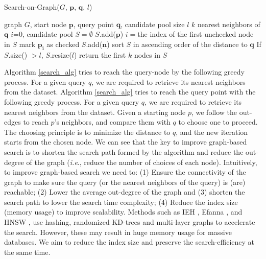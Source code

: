 \documentclass{vldb}
\def\ie {\emph{i.e}.} \def\Ie{\emph{I.e}.}
\begin{document}
\begin{algorithm}[t]\small
	\caption{Search-on-Graph($G$, $\textbf{p}$, $\textbf{q}$, $l$)}
	\label{search_alg}
	\begin{algorithmic}[1]
		\Require graph $G$, start node $\textbf{p}$, query point $\textbf{q}$, candidate pool size $l$
		\Ensure $k$ nearest neighbors of $\textbf{q}$
		\State $i$=0, candidate pool $S = \emptyset$
		\State $S$.add($\textbf{p}$)
		\State $i=$the index of the first unchecked node in $S$
		\State mark $\textbf{p}_\textbf{i}$ as checked
		\State $S$.add($\textbf{n}$)
		\EndFor
		\State sort $S$ in ascending order of the distance to $\textbf{q}$
		\State If $S$.size() $>l$, $S$.resize($l$) %
		\EndWhile
		\State return the first $k$ nodes in $S$
	\end{algorithmic}
\end{algorithm}

Algorithm \ref{search_alg} tries to reach the query-node by the following greedy process. For a given query $q$, we are required to retrieve its nearest neighbors from the dataset. Algorithm \ref{search_alg} tries to reach the query point with the following greedy process. For a given query $q$, we are required to retrieve its nearest neighbors from the dataset. Given a starting node $p$, we follow the out-edges to reach $p$'s neighbors, and compare them with $q$ to choose one to proceed. The choosing principle is to minimize the distance to $q$, and the new iteration starts from the chosen node. We can see that the key to improve graph-based search is to shorten the search path formed by the algorithm and reduce the out-degree of the graph (\ie, reduce the number of choices of each node). Intuitively, to improve graph-based search we need to: (1) Ensure the connectivity of the graph to make sure the query (or the nearest neighbors of the query) is (are) reachable; (2) Lower the average out-degree of the graph and (3) shorten the search path to lower the search time complexity; (4) Reduce the index size (memory usage) to improve scalability. Methods such as IEH \cite{Jin2014Fast}, Efanna \cite{CongEfanna2016}, and HNSW \cite{MalkovYHNSW16}, use hashing, randomized KD-trees and multi-layer graphs to accelerate the search. However, these may result in huge memory usage  for massive databases. We aim to reduce the index size and preserve the search-efficiency at the same time. 
\end{document}
